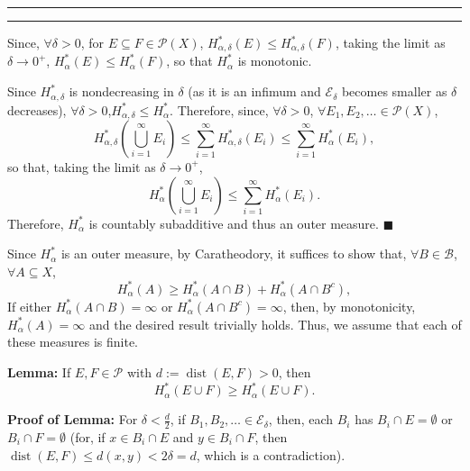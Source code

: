 \documentclass[11pt]{article}
\newcounter{questionCounter}
\newcounter{partCounter}[questionCounter]
\newenvironment{question}[2][\arabic{questionCounter}]{%
    \setcounter{partCounter}{0}%
    \vspace{.25in} \hrule \vspace{0.5em}%
        \noindent{\bf #2}%
    \vspace{0.8em} \hrule \vspace{.10in}%
    \addtocounter{questionCounter}{1}%
}{}
\renewcommand{\qed}{\quad $\blacksquare$}
\newcommand{\dist}{\operatorname{dist}}
\begin{document}
\begin{question}{Problem 4}
\begin{enumerate}[(a)]
Since, $\forall \delta > 0$, for $E \subseteq F \in \mathcal{P}(X)$,
$H^*_{\alpha,\delta}(E) \leq H^*_{\alpha,\delta}(F)$, taking the limit as 
$\delta \rightarrow 0^+$,
$H^*_{\alpha}(E) \leq H^*_{\alpha}(F)$, so that $H^*_{\alpha}$ is monotonic.

Since $H^*_{\alpha,\delta}$ is nondecreasing in $\delta$ (as it is an infimum
and $\mathcal{E}_{\delta}$ becomes smaller as $\delta$ decreases),
$\forall \delta > 0$,$H^*_{\alpha,\delta} \leq H^*_{\alpha}$.
Therefore, since, $\forall \delta > 0$,
$\forall E_1,E_2,\ldots \in \mathcal{P}(X)$,
\[H^*_{\alpha,\delta}\left(\bigcup_{i = 1}^{\infty} E_i\right)
  \leq \sum_{i = 1}^{\infty} H^*_{\alpha,\delta}(E_i)
  \leq \sum_{i = 1}^{\infty} H^*_{\alpha}(E_i),
\]
so that, taking the limit as $\delta \rightarrow 0^+$,
\[H^*_{\alpha}\left(\bigcup_{i = 1}^{\infty} E_i\right)
  \leq \sum_{i = 1}^{\infty} H^*_{\alpha}(E_i).
\]
Therefore, $H^*_{\alpha}$ is countably subadditive and thus an outer measure.
\qed

Since $H^*_{\alpha}$ is an outer measure, by Caratheodory, it suffices to show
that, $\forall B \in \mathcal{B}$, $\forall A \subseteq X$,
\[H^*_{\alpha}(A) \geq H^*_{\alpha}(A \cap B) + H^*_{\alpha}(A \cap B^c),\]
If either $H^*_{\alpha}(A \cap B) = \infty$ or
$H^*_{\alpha}(A \cap B^c) = \infty$, then, by monotonicity,
$H^*_{\alpha}(A) = \infty$ and the desired result trivially holds. Thus, we
assume that each of these measures is finite.

{\bf Lemma:} If $E,F \in \mathcal{P}$ with $d := \dist(E,F) > 0$, then
\[H^*_{\alpha}(E \cup F) \geq H^*_{\alpha}(E \cup F).\]

{\bf Proof of Lemma:} For $\delta < \frac{d}{2}$, if
$B_1,B_2,\ldots \in \mathcal{E}_{\delta}$, then, each $B_i$ has
$B_i \cap E = \emptyset$ or $B_i \cap F = \emptyset$ (for, if
$x \in B_i \cap E$ and $y \in B_i \cap F$, then
$\dist(E,F) \leq d(x,y) < 2\delta = d$, which is a contradiction).


\end{enumerate}
\end{question}
\end{document}
